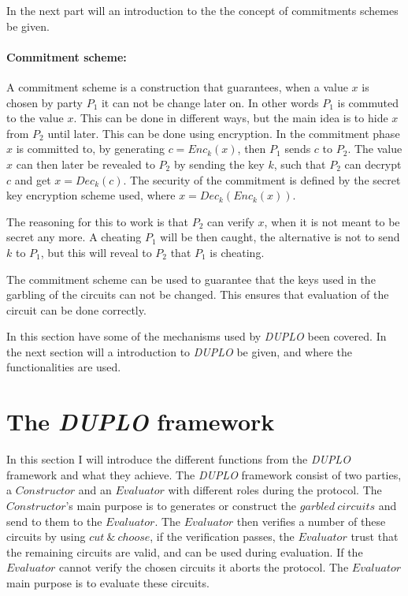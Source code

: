 \documentclass[twoside,11pt,openright]{report}
\newcommand{\DUPLO}{\textit{DUPLO} }
\begin{document}
\bigskip

In the next part will an introduction to the the concept of commitments schemes be given.

\paragraph{Commitment scheme:}
A commitment scheme is a construction that guarantees, when a value $x$ is chosen by party $P_1$ it can not be change later on. In other words $P_1$ is commuted to the value $x$. This can be done in different ways, but the main idea is to hide $x$ from $P_2$ until later. This can be done using encryption. In the commitment phase $x$ is committed to, by generating $c=Enc_k(x)$, then $P_1$ sends $c$ to $P_2$. The value $x$ can then later be revealed to $P_2$ by sending the key $k$, such that $P_2$ can decrypt $c$ and get $x=Dec_k(c)$. The security of the commitment is defined by the secret key encryption scheme used, where $x=Dec_k(Enc_k(x))$.

The reasoning for this to work is that $P_2$ can verify $x$, when it is not meant to be secret any more. A cheating $P_1$ will be then caught, the alternative is not to send $k$ to $P_1$, but this will reveal to $P_2$ that $P_1$ is cheating. 

The commitment scheme can be used to guarantee that the keys used in the garbling of the circuits can not be changed. This ensures that evaluation of the circuit can be done correctly.

\bigskip

In this section have some of the mechanisms used by \DUPLO been covered. In the next section will a introduction to \DUPLO be given, and where the functionalities are used.

\section{The \DUPLO framework}
\label{sec:duplo_framework}
In this section I will introduce the different functions from the \DUPLO framework and what they achieve. The \DUPLO framework consist of two parties, a $Constructor$ and an $Evaluator$ with different roles during the protocol. The $Constructor$'s main purpose is to generates or construct the $garbled~circuits$ and send to them to the $Evaluator$. The $Evaluator$ then verifies a number of these circuits by using $cut~\&~choose$, if the verification passes, the $Evaluator$ trust that the remaining circuits are valid, and can be used during evaluation. If the $Evaluator$ cannot verify the chosen circuits it aborts the protocol. The $Evaluator$ main purpose is to evaluate these circuits.
\end{document}
